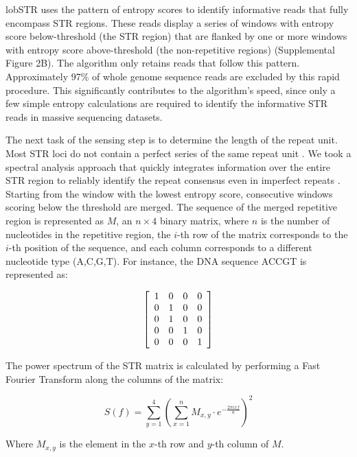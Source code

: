 lobSTR uses the pattern of entropy scores to identify informative reads that fully encompass STR regions. These reads display a series of windows with entropy score below-threshold (the STR region) that are flanked by one or more windows with entropy score above-threshold (the non-repetitive regions) (Supplemental Figure 2B). The algorithm only retains reads that follow this pattern. Approximately 97\% of whole genome sequence reads are excluded by this rapid procedure. This significantly contributes to the algorithm's speed, since only a few simple entropy calculations are required to identify the informative STR reads in massive sequencing datasets.

The next task of the sensing step is to determine the length of the repeat unit. Most STR loci do not contain a perfect series of the same repeat unit \cite{Benson1999}. We took a spectral analysis approach that quickly integrates information over the entire STR region to reliably identify the repeat consensus even in imperfect repeats \cite{SharmaIssacRaghavaEtAl2004}. Starting from the window with the lowest entropy score, consecutive windows scoring below the threshold are merged. The sequence of the merged repetitive region is represented as $M$, an $n \times 4$ binary matrix, where $n$ is the number of nucleotides in the repetitive region, the $i$-th row of the matrix corresponds to the $i$-th position of the sequence, and each column corresponds to a different nucleotide type (A,C,G,T). For instance, the DNA sequence ACCGT is represented as:

\begin{equation}
\left[
\begin{array}{c c c c}
1 & 0 & 0 & 0 \\
0 & 1 & 0 & 0 \\
0 & 1 & 0 & 0 \\
0 & 0 & 1 & 0 \\
0 & 0 & 0 & 1 \\
\end{array}
\right]
\end{equation}

The power spectrum of the STR matrix is calculated by performing a Fast Fourier Transform along the columns of the matrix:

\begin{equation}
S(f) = \sum_{y=1}^4 \left( \sum_{x=1}^n M_{x,y} \cdot e^{-\frac{2\pi ixf}{n}} \right) ^2
\end{equation}

Where $M_{x,y}$ is the element in the $x$-th row and $y$-th column of $M$.

